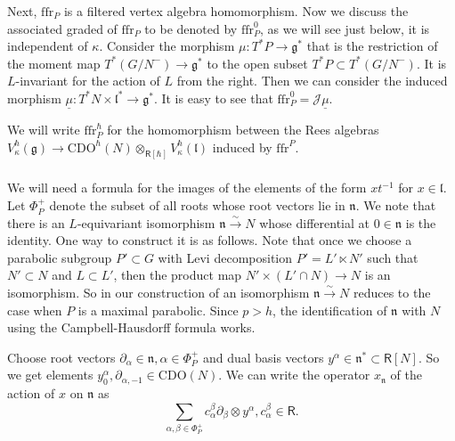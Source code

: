 \documentclass{amsart}
\theoremstyle{definition}
\newcommand{\fl}{\mathfrak{l}}
\newcommand{\sss}{\subsubsection{}}
\newcommand{\Ring}{\mathsf{R}}
\newcommand{\g}{\mathfrak{g}}
\newcommand{\ffr}{\mathrm{ffr}}
\newcommand{\lf}{\mathfrak{l}}
\newcommand{\Jet}{\mathscr{J}}
\newcommand{\CDO}{\mathrm{CDO}}
\numberwithin{equation}{section}
\begin{document}
\sss\label{SSS_ffrp_classical}
Next, $\ffr_P$ is a filtered vertex algebra homomorphism. 
Now we discuss the associated graded of $\ffr_P$ to be denoted by $\ffr_P^0$, as we will see just below, it is independent of $\kappa$. 
Consider the morphism $\mu: T^*P\rightarrow \g^*$ that is the restriction of the moment map $T^*(G/N^-)\rightarrow \g^*$ to the open subset $T^*P\subset T^*(G/N^-)$. It is $L$-invariant for the action of $L$ from the right. Then we can consider the induced morphism $\underline{\mu}: T^*N\times \mathfrak{l}^*\rightarrow \g^*$. It is easy to see that $\ffr^0_P=\Jet\underline{\mu}$.

We will write $\ffr_P^\hbar$ for the homomorphism between the Rees algebras $V_\kappa^\hbar(\g)\rightarrow \CDO^\hbar(N)\otimes_{\Ring[\hbar]}V^\hbar_\kappa(\lf)$ induced by $\ffr^P$.

\sss\label{SSS_Cartan_images_ffr}
We will need a formula for the images of the elements of the form $xt^{-1}$ for $x\in \fl$. Let $\Phi_P^+$ denote the subset of all  roots whose root vectors lie in $\mathfrak{n}$. We note that there is an $L$-equivariant isomorphism $\mathfrak{n}\xrightarrow{\sim} N$ whose differential at $0\in \mathfrak{n}$ is the identity.
One way to construct it is as follows. Note that once we choose a parabolic subgroup $P'\subset G$ with Levi decomposition $P'=L'\ltimes N'$ such that $N'\subset N$ and $L\subset L'$, then the product map $N'\times (L'\cap N)\rightarrow N$ is an isomorphism. So in our construction of an isomorphism $\mathfrak{n}\xrightarrow{\sim} N$ reduces to the case when $P$ is a maximal parabolic. Since $p>h$, the identification of $\mathfrak{n}$ with $N$ using the Campbell-Hausdorff formula works. 

Choose root vectors $\partial_\alpha\in \mathfrak{n}, \alpha\in \Phi^+_P$ and dual basis vectors $y^\alpha\in \mathfrak{n}^*\subset \Ring[N]$. So we get elements $y^\alpha_0,\partial_{\alpha,-1}\in \CDO(N)$. We can write the operator $x_{\mathfrak{n}}$ of the action of $x$ on $\mathfrak{n}$ as 
$$\sum_{\alpha,\beta\in \Phi_P^+}c_\alpha^\beta \partial_\beta\otimes y^\alpha, c_\alpha^\beta\in \Ring.$$
\end{document}
